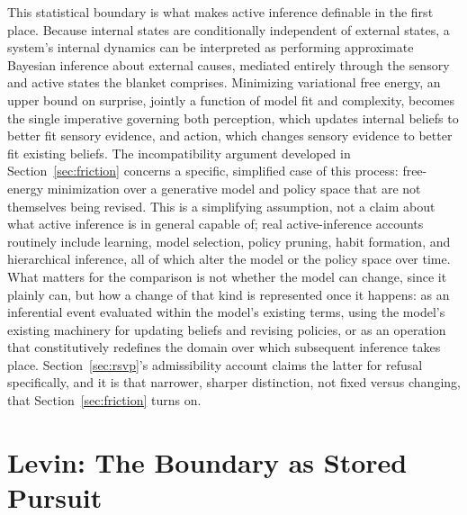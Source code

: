 \documentclass[11pt]{article}
\theoremstyle{plain}
\begin{document}
This statistical boundary is what makes active inference definable in the first place. Because internal states are conditionally independent of external states, a system's internal dynamics can be interpreted as performing approximate Bayesian inference about external causes, mediated entirely through the sensory and active states the blanket comprises. Minimizing variational free energy, an upper bound on surprise, jointly a function of model fit and complexity, becomes the single imperative governing both perception, which updates internal beliefs to better fit sensory evidence, and action, which changes sensory evidence to better fit existing beliefs. The incompatibility argument developed in Section~\ref{sec:friction} concerns a specific, simplified case of this process: free-energy minimization over a generative model and policy space that are not themselves being revised. This is a simplifying assumption, not a claim about what active inference is in general capable of; real active-inference accounts routinely include learning, model selection, policy pruning, habit formation, and hierarchical inference, all of which alter the model or the policy space over time. What matters for the comparison is not whether the model can change, since it plainly can, but how a change of that kind is represented once it happens: as an inferential event evaluated within the model's existing terms, using the model's existing machinery for updating beliefs and revising policies, or as an operation that constitutively redefines the domain over which subsequent inference takes place. Section~\ref{sec:rsvp}'s admissibility account claims the latter for refusal specifically, and it is that narrower, sharper distinction, not fixed versus changing, that Section~\ref{sec:friction} turns on.

\section{Levin: The Boundary as Stored Pursuit}
\label{sec:levin}
\end{document}

